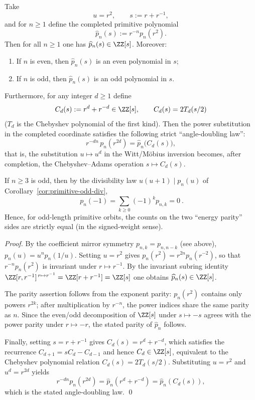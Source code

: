 \begin{corollary}\label{cor:primitive-completion-hatp}
Take
\[
u=r^2,\qquad s:=r+r^{-1},
\]
and for \(n\ge 1\) define the completed primitive polynomial
\[
\widehat p_n(s):=r^{-n}p_n(r^2).
\]
Then for all \(n\ge 1\) one has \(\widehat p_n(s)\in\ZZ[s]\). Moreover:
\begin{enumerate}
  \item If \(n\) is even, then \(\widehat p_n(s)\) is an even polynomial in \(s\);
  \item If \(n\) is odd, then \(\widehat p_n(s)\) is an odd polynomial in \(s\).
\end{enumerate}
Furthermore, for any integer \(d\ge 1\) define
\[
C_d(s):=r^d+r^{-d}\in\ZZ[s],
\qquad
C_d(s)=2T_d(s/2)
\]
(\(T_d\) is the Chebyshev polynomial of the first kind). Then the power substitution in the completed coordinate satisfies the following strict ``angle-doubling law'':
\[
r^{-dn}\,p_n(r^{2d})=\widehat p_n\!\bigl(C_d(s)\bigr),
\]
that is, the substitution \(u\mapsto u^d\) in the Witt/M\"obius inversion becomes, after completion, the Chebyshev--Adams operation \(s\mapsto C_d(s)\).
\end{corollary}

\begin{corollary}[Strict parity balance for odd lengths: \texorpdfstring{$p_n(-1)=0$}{p_n(-1)=0}]\label{cor:primitive-odd-parity-balance}
If \(n\ge 3\) is odd, then by the divisibility law \(u(u+1)\mid p_n(u)\) of Corollary~\ref{cor:primitive-odd-div},
\[
\boxed{\ p_n(-1)=\sum_{k\ge 0}(-1)^k p_{n,k}=0\ }.
\]
Hence, for odd-length primitive orbits, the counts on the two ``energy parity'' sides are strictly equal (in the signed-weight sense).
\end{corollary}
\begin{proof}
By the coefficient mirror symmetry \(p_{n,k}=p_{n,n-k}\) (see above),
\(
p_n(u)=u^n p_n(1/u)
\).
Setting \(u=r^2\) gives
\(
p_n(r^2)=r^{2n}p_n(r^{-2})
\),
so that \(r^{-n}p_n(r^2)\) is invariant under \(r\mapsto r^{-1}\). By the invariant subring identity
\(
\ZZ[r,r^{-1}]^{\,r\mapsto r^{-1}}=\ZZ[r+r^{-1}]=\ZZ[s]
\)
one obtains \(\widehat p_n(s)\in\ZZ[s]\).
\par
The parity assertion follows from the exponent parity: \(p_n(r^2)\) contains only powers \(r^{2k}\); after multiplication by \(r^{-n}\), the power indices share the same parity as \(n\). Since the even/odd decomposition of \(\ZZ[s]\) under \(s\mapsto -s\) agrees with the power parity under \(r\mapsto -r\), the stated parity of \(\widehat p_n\) follows.
\par
Finally, setting \(s=r+r^{-1}\) gives
\(
C_d(s)=r^d+r^{-d}
\),
which satisfies the recurrence \(C_{d+1}=sC_d-C_{d-1}\) and hence \(C_d\in\ZZ[s]\), equivalent to the Chebyshev polynomial relation \(C_d(s)=2T_d(s/2)\). Substituting \(u=r^2\) and \(u^d=r^{2d}\) yields
\[
r^{-dn}p_n(r^{2d})=\widehat p_n(r^d+r^{-d})=\widehat p_n(C_d(s)),
\]
which is the stated angle-doubling law. \qed
\end{proof}

